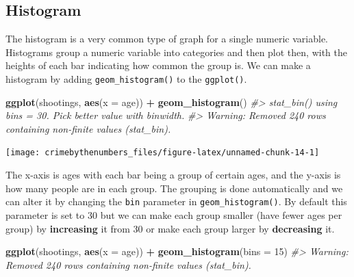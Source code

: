 \documentclass[
  12pt,
]{book}
\newenvironment{Shaded}{\begin{snugshade}}{\end{snugshade}}
\newcommand{\CommentTok}[1]{\textcolor[rgb]{0.37,0.37,0.37}{\textit{#1}}}
\newcommand{\DataTypeTok}[1]{\textcolor[rgb]{0.27,0.27,0.27}{#1}}
\newcommand{\DecValTok}[1]{\textcolor[rgb]{0.06,0.06,0.06}{#1}}
\newcommand{\KeywordTok}[1]{\textcolor[rgb]{0.27,0.27,0.27}{\textbf{#1}}}
\newcommand{\NormalTok}[1]{#1}
\newcommand{\OperatorTok}[1]{\textcolor[rgb]{0.43,0.43,0.43}{\textbf{#1}}}
\newcommand{\StringTok}[1]{\textcolor[rgb]{0.5,0.5,0.5}{#1}}
\begin{document}
\hypertarget{histogram}{%
\subsection{Histogram}\label{histogram}}

The histogram is a very common type of graph for a single numeric variable. Histograms group a numeric variable into categories and then plot then, with the heights of each bar indicating how common the group is. We can make a histogram by adding \texttt{geom\_histogram()} to the \texttt{ggplot()}.

\begin{Shaded}
\begin{Highlighting}[]
\KeywordTok{ggplot}\NormalTok{(shootings, }\KeywordTok{aes}\NormalTok{(}\DataTypeTok{x =}\NormalTok{ age)) }\OperatorTok{+}\StringTok{ }
\StringTok{  }\KeywordTok{geom\_histogram}\NormalTok{()}
\CommentTok{\#> \textasciigrave{}stat\_bin()\textasciigrave{} using \textasciigrave{}bins = 30\textasciigrave{}. Pick better value with \textasciigrave{}binwidth\textasciigrave{}.}
\CommentTok{\#> Warning: Removed 240 rows containing non{-}finite values (stat\_bin).}
\end{Highlighting}
\end{Shaded}

\begin{center}\texttt{[image: crimebythenumbers\_files/figure-latex/unnamed-chunk-14-1]} \end{center}

The x-axis is ages with each bar being a group of certain ages, and the y-axis is how many people are in each group. The grouping is done automatically and we can alter it by changing the \texttt{bin} parameter in \texttt{geom\_histogram()}. By default this parameter is set to 30 but we can make each group smaller (have fewer ages per group) by \textbf{increasing} it from 30 or make each group larger by \textbf{decreasing} it.

\begin{Shaded}
\begin{Highlighting}[]
\KeywordTok{ggplot}\NormalTok{(shootings, }\KeywordTok{aes}\NormalTok{(}\DataTypeTok{x =}\NormalTok{ age)) }\OperatorTok{+}\StringTok{ }
\StringTok{  }\KeywordTok{geom\_histogram}\NormalTok{(}\DataTypeTok{bins =} \DecValTok{15}\NormalTok{)}
\CommentTok{\#> Warning: Removed 240 rows containing non{-}finite values (stat\_bin).}
\end{Highlighting}
\end{Shaded}
\end{document}

